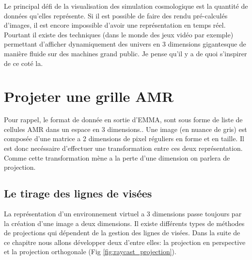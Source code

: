 


Le principal défi de la visualisation des simulation cosmologique est la quantité de données qu'elles représente.
Si il est possible de faire des rendu pré-calculés d'images, il est encore impossible d'avoir une représentation en temps réel.
Pourtant il existe des techniques (dans le monde des jeux vidéo par exemple) permettant d'afficher dynamiquement des univers en 3 dimensions gigantesque de manière fluide sur des machines grand public.
Je pense qu'il y a de quoi s'inspirer de ce coté la.




\section{Projeter une grille AMR}

Pour rappel, le format de donnée en sortie d'EMMA, sont sous forme de liste de cellules AMR dans un  espace en 3 dimensions..
Une image (en nuance de gris) est composée d'une matrice a 2 dimensions de pixel réguliers en forme et en taille.
Il est donc necéssaire d'effectuer une transformation entre ces deux représentation.
Comme cette transformation mène a la perte d'une dimension on parlera de projection.

\subsection{Le tirage des lignes de visées}

La représentation d'un environnement virtuel a 3 dimensions passe toujours par la création d'une image a deux dimensions.
Il existe différents types de méthodes de projections qui dépendent de la gestion des lignes de visées.
Dans la suite de ce chapitre nous allons développer deux d'entre elles: la projection en perspective et la projection orthogonale (Fig \ref{fig:raycast_projection}).

